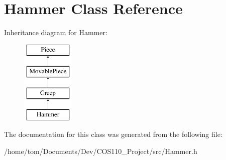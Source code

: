 \hypertarget{classHammer}{\section{Hammer Class Reference}
\label{classHammer}
}
Inheritance diagram for Hammer\-:\begin{figure}[H]
\begin{center}
\leavevmode
\includegraphics[height=4.000000cm]{classHammer}
\end{center}
\end{figure}


The documentation for this class was generated from the following file\-:\begin{DoxyCompactItemize}
\item 
/home/tom/\-Documents/\-Dev/\-C\-O\-S110\-\_\-\-Project/src/Hammer.\-h\end{DoxyCompactItemize}
